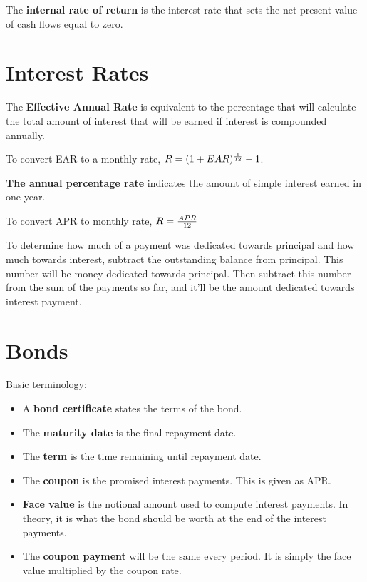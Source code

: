 \documentclass[english, 12pt]{article}
\begin{document}
\begin{defn}
The \textbf{internal rate of return} is the interest rate that sets the net present value of cash flows equal to zero.
\end{defn}

\section{Interest Rates}

\begin{defn}
The \textbf{Effective Annual Rate} is equivalent to the percentage that will calculate the total amount of interest that will be earned if interest is compounded annually.
\end{defn}

\begin{note}
To convert EAR to a monthly rate, $R = (1 + EAR)^{\frac{1}{12}} - 1$.
\end{note}

\begin{defn}
\textbf{The annual percentage rate} indicates the amount of simple interest earned in one year.
\end{defn}

\begin{note}
To convert APR to monthly rate, $R = \frac{APR}{12}$
\end{note}

\begin{note}
To determine how much of a payment was dedicated towards principal and how much towards interest, subtract the outstanding balance from principal. This number will be money dedicated towards principal. Then subtract this number from the sum of the payments so far, and it'll be the amount dedicated towards interest payment.
\end{note}

\section{Bonds}

\begin{defn}
Basic terminology:
\begin{itemize}
\item A \textbf{bond certificate} states the terms of the bond.
\item The \textbf{maturity date} is the final repayment date.
\item The \textbf{term} is the time remaining until repayment date.
\item The \textbf{coupon} is the promised interest payments. This is given as APR.
\item \textbf{Face value} is the notional amount used to compute interest payments. In theory, it is what the bond should be worth at the end of the interest payments.
\item The \textbf{coupon payment} will be the same every period. It is simply the face value multiplied by the coupon rate.
\end{itemize}
\end{defn}
\end{document}
